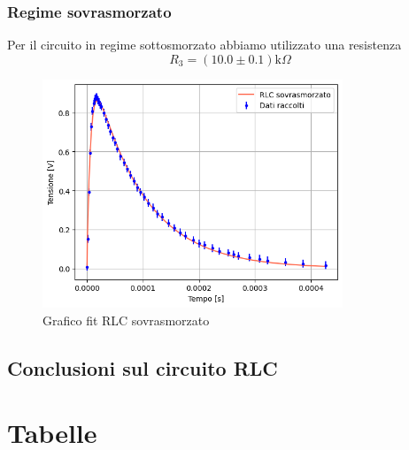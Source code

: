 \documentclass[letterpaper,12pt]{article}
\begin{document}
\subsubsection{Regime sovrasmorzato}
Per il circuito in regime sottosmorzato abbiamo utilizzato una resistenza $$R_3 =(10.0\pm0.1)\text{k}\Omega $$

\begin{figure}[h!]
	\centering
	\includegraphics[width=0.8\textwidth]{RLCsovra.png}
	\caption{Grafico fit RLC sovrasmorzato}
	\label{fig:fitRLCsovra}
\end{figure}



\subsection{Conclusioni sul circuito RLC}



\section{Tabelle}
\end{document}
